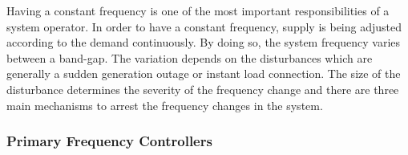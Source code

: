 Having a constant frequency is one of the most important responsibilities of a system operator. In order to have a constant frequency, supply is being adjusted according to the demand continuously. By doing so, the system frequency varies between a band-gap. The variation depends on the disturbances which are generally a sudden generation outage or instant load connection. The size of the disturbance determines the severity of the frequency change and there are three main mechanisms to arrest the frequency changes in the system. 

\subsubsection{Primary Frequency Controllers}

